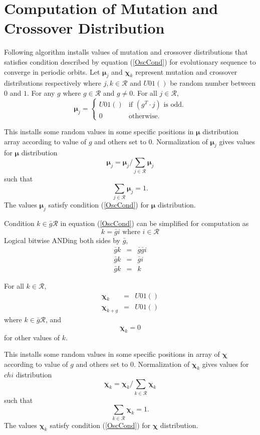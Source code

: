 \section{Computation of Mutation and Crossover Distribution}
Following algorithm installs values of mutation and crossover distributions that satisfies condition described 
by equation (\ref{OscCond}) for evolutionary sequence to converge in periodic orbits.
Let $\bm{\mu}_j$ and $\bm{\chi}_k$ represent mutation and crossover distributions respectively where $j,k \in \mathcal{R}$ 
and $U01()$ be random number between $0$ and $1$. For any $g$ where $g \in \mathcal{R}$ and $g \neq 0$.
For all $j \in \mathcal{R}$,
\[
\bm{\mu}_j = \begin{cases}
    U01() & \text{if $(g^T\cdot j)$ is odd}.\\
    0 & \text{otherwise}.
  \end{cases}
\]

This installs some random values in some specific positions in $\bm{\mu}$ distribution array according to value of $g$ and others set to $0$. 
Normalization of $\bm{\mu}_j$ gives values for $\bm{\mu}$ distribution
\[
\bm{\mu}_j = \bm{\mu}_j / \sum \limits_{j \in \mathcal{R} } \bm{\mu}_j
\]
such that 
\[
\sum \limits_{j \in \mathcal{R} } \bm{\mu}_j = 1.
\]
The values $\bm{\mu}_j$ satisfy condition (\ref{OscCond}) for $\bm{\mu}$ distribution.


Condition $k \in \bar{g} \mathcal{R}$ in equation (\ref{OscCond}) can be simplified for computation as
\[
k = \bar{g} i  \text{ where $i \in \mathcal{R}$}
\]
Logical bitwise ANDing both sides by $\bar{g}$,
\begin{eqnarray*}
\bar{g} k & = & \bar{g} \bar{g} i \\
\bar{g} k & = & \bar{g} i \\
\bar{g} k & = & k 
\end{eqnarray*}

For all $k \in \mathcal{R}$,
\begin{eqnarray*}
\bm{\chi}_k & = & U01() \\
\bm{\chi}_{k+g} & = & U01() 
\end{eqnarray*}
where $k \in \bar{g} \mathcal{R}$, and
\[
\bm{\chi}_k = 0
\]
for other values of $k$. \newline

This installs some random values in some specific positions in array of $\bm{\chi}$ according to value of $g$ 
and others set to $0$. Normalization of $\bm{\chi}_k$ gives values for $chi$ distribution 
\[
\bm{\chi}_k = \bm{\chi}_k/\sum\limits_{k \in \mathcal{R}} \bm{\chi}_k
\]
such that 
\[
\sum\limits_{k \in \mathcal{R}} \bm{\chi}_k = 1.
\]
The values $\bm{\chi}_k$ satisfy condition (\ref{OscCond}) for $\bm{\chi}$ distribution.

